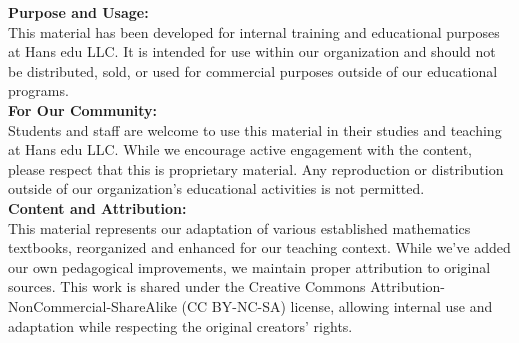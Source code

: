 \begin{center}
  \begin{minipage}{0.85\textwidth}
    {\small\textbf{Purpose and Usage:}}\\[0.2cm]
    {\footnotesize
    This material has been developed for internal training and educational 
    purposes at Hans edu LLC. It is intended for use within our organization 
    and should not be distributed, sold, or used for commercial purposes 
    outside of our educational programs.}\\[0.5cm]
    
    {\small\textbf{For Our Community:}}\\[0.2cm]
    {\footnotesize
    Students and staff are welcome to use this material in their studies and 
    teaching at Hans edu LLC. While we encourage active engagement with the 
    content, please respect that this is proprietary material. Any 
    reproduction or distribution outside of our organization's educational 
    activities is not permitted.}\\[0.5cm]
    
    {\small\textbf{Content and Attribution:}}\\[0.2cm]
    {\footnotesize
    This material represents our adaptation of various established mathematics 
    textbooks, reorganized and enhanced for our teaching context. While we've 
    added our own pedagogical improvements, we maintain proper attribution to 
    original sources. This work is shared under the Creative Commons 
    Attribution-NonCommercial-ShareAlike (CC BY-NC-SA) license, allowing 
    internal use and adaptation while respecting the original creators' rights.
    }\\[0.5cm]


\end{minipage}
\end{center}
